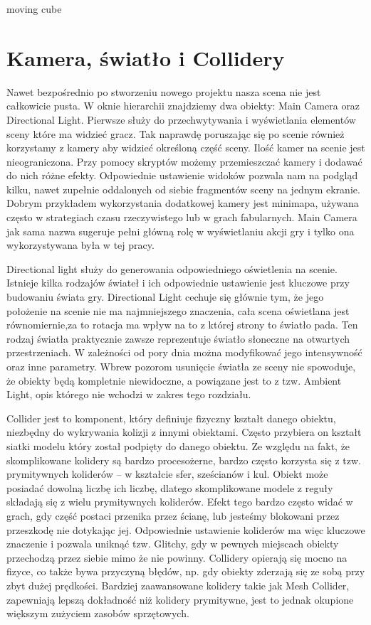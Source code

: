 \documentclass[brudnopis]{xmgr}
\begin{document}
moving cube

\section{Kamera, światło i Collidery}

Nawet bezpośrednio po stworzeniu nowego projektu nasza scena nie jest całkowicie pusta. W oknie hierarchii znajdziemy dwa obiekty: Main Camera oraz Directional Light. Pierwsze służy do przechwytywania i wyświetlania elementów sceny które ma widzieć gracz. Tak naprawdę poruszając się po scenie również korzystamy z kamery aby widzieć określoną część sceny. Ilość kamer na scenie jest nieograniczona. Przy pomocy skryptów możemy przemieszczać kamery i dodawać do nich różne efekty. Odpowiednie ustawienie widoków pozwala nam na podgląd kilku, nawet zupełnie oddalonych od siebie fragmentów sceny na jednym ekranie. Dobrym przykładem wykorzystania dodatkowej kamery jest minimapa, używana często w strategiach czasu rzeczywistego lub w grach fabularnych.  Main Camera jak sama nazwa sugeruje pełni główną rolę w wyświetlaniu akcji gry i tylko ona wykorzystywana była w tej pracy.

Directional light służy do generowania odpowiedniego oświetlenia na scenie. Istnieje kilka rodzajów świateł i ich odpowiednie ustawienie jest kluczowe przy budowaniu świata gry. Directional Light cechuje się głównie tym, że jego położenie na scenie nie ma najmniejszego znaczenia, cała scena oświetlana jest równomiernie,za to rotacja ma wpływ na to z której strony to światło pada. Ten rodzaj światła praktycznie zawsze reprezentuje światło słoneczne na otwartych przestrzeniach. W zależności od pory dnia można modyfikować jego intensywność oraz inne parametry. Wbrew pozorom usunięcie światła ze sceny nie spowoduje, że obiekty będą kompletnie niewidoczne, a powiązane jest to z tzw. Ambient Light, opis którego nie wchodzi w zakres tego rozdziału.

Collider jest to komponent, który definiuje fizyczny kształt danego obiektu, niezbędny do wykrywania kolizji z innymi obiektami. Często przybiera on kształt siatki modelu który został podpięty do danego obiektu. Ze względu na fakt, że skomplikowane kolidery są bardzo procesożerne, bardzo często korzysta się z tzw. prymitywnych koliderów – w kształcie sfer, sześcianów i kul. Obiekt może posiadać dowolną liczbę ich liczbę, dlatego skomplikowane modele z reguły składają się z wielu prymitywnych koliderów. Efekt tego bardzo często widać w grach, gdy część postaci przenika przez ścianę, lub jesteśmy blokowani przez przeszkodę nie dotykając jej. Odpowiednie ustawienie koliderów ma więc kluczowe znaczenie i pozwala uniknąć tzw. Glitchy, gdy w pewnych miejscach obiekty przechodzą przez siebie mimo że nie powinny. Collidery opierają się mocno na fizyce, co także bywa przyczyną błędów, np. gdy obiekty zderzają się ze sobą przy zbyt dużej prędkości. Bardziej zaawansowane kolidery takie jak Mesh Collider, zapewniają lepszą dokładność niż kolidery prymitywne, jest to jednak okupione większym zużyciem zasobów sprzętowych. 
\end{document}
